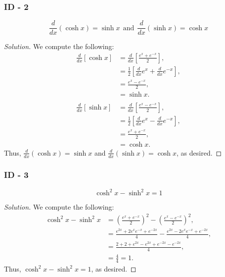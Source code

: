 \documentclass[letterpaper, 12pt]{amsart}
\theoremstyle{definition}  %
\begin{document}
			\subsubsection*{ID - 2}
			\[ \frac{d}{dx}(\cosh x) = \sinh x \ \ \text{and} \ \ \frac{d}{dx}(\sinh x) = \cosh x \]

			\begin{proof}[Solution]
			We compute the following:
				\begin{align*}
					\frac{d}{dx}\left[ \cosh x \right] &= \frac{d}{dx}\left[ \frac{e^{x} + e^{-x}}{2} \right], \\
					&= \frac{1}{2}\left[  \frac{d}{dx} e^{x} + \frac{d}{dx} e^{-x} \right], \\
					&= \frac{e^{x} - e^{-x}}{2}, \\
					&= \sinh x. \\
					\\
					\frac{d}{dx}\left[ \sinh x \right] &= \frac{d}{dx}\left[ \frac{e^{x} - e^{-x}}{2} \right], \\
					&= \frac{1}{2}\left[  \frac{d}{dx} e^{x} - \frac{d}{dx} e^{-x} \right], \\
					&= \frac{e^{x} + e^{-x}}{2}, \\
					&= \cosh x. 
				\end{align*}
			Thus, $\frac{d}{dx}(\cosh x) = \sinh x$ and $\frac{d}{dx}(\sinh x) = \cosh x$, as desired.	
			\end{proof}

			\subsubsection*{ID - 3}
			\[ \cosh^{2} x - \sinh^{2} x = 1 \]

			\begin{proof}[Solution]
			We compute the following:
				\begin{align*}
					\cosh^{2} x - \sinh^{2} x &= \left( \frac{e^{x} + e^{-x}}{2} \right)^{2} - \left( \frac{e^{x} - e^{-x}}{2} \right)^{2}, \\
					&= \frac{e^{2x} + 2e^{x}e^{-x} + e^{-2x}}{4} - \frac{e^{2x} - 2e^{x}e^{-x} + e^{-2x}}{4}, \\
					&= \frac{2 + 2 + e^{2x} - e^{2x} + e^{-2x} - e^{-2x}}{4}, \\
					&= \frac{4}{4} = 1.
				\end{align*}
			Thus, $\cosh^{2} x - \sinh^{2} x = 1$, as desired.	
			\end{proof}
			\pagebreak
\end{document}
